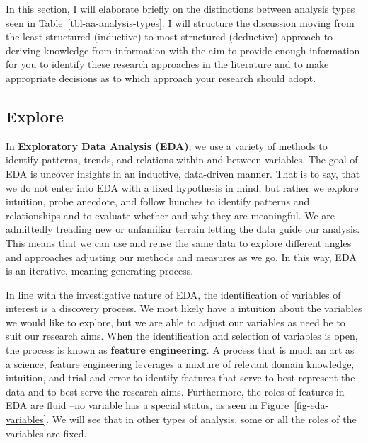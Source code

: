 \documentclass[
  letterpaper,
]{latex/krantz}
\theoremstyle{definition}
\theoremstyle{remark}
\begin{document}
In this section, I will elaborate briefly on the distinctions between
analysis types seen in Table~\ref{tbl-aa-analysis-types}. I will
structure the discussion moving from the least structured (inductive) to
most structured (deductive) approach to deriving knowledge from
information with the aim to provide enough information for you to
identify these research approaches in the literature and to make
appropriate decisions as to which approach your research should adopt.

\subsection{Explore}\label{sec-aa-explore}

In \textbf{Exploratory Data Analysis (EDA)}, we use a variety of methods
to identify patterns, trends, and relations within and between
variables. The goal of EDA is uncover insights in an inductive,
data-driven manner. That is to say, that we do not enter into EDA with a
fixed hypothesis in mind, but rather we explore intuition, probe
anecdote, and follow hunches to identify patterns and relationships and
to evaluate whether and why they are meaningful. We are admittedly
treading new or unfamiliar terrain letting the data guide our analysis.
This means that we can use and reuse the same data to explore different
angles and approaches adjusting our methods and measures as we go. In
this way, EDA is an iterative, meaning generating process.

In line with the investigative nature of EDA, the identification of
variables of interest is a discovery process. We most likely have a
intuition about the variables we would like to explore, but we are able
to adjust our variables as need be to suit our research aims. When the
identification and selection of variables is open, the process is known
as \textbf{feature engineering}. A process that is much an art as a
science, feature engineering leverages a mixture of relevant domain
knowledge, intuition, and trial and error to identify features that
serve to best represent the data and to best serve the research aims.
Furthermore, the roles of features in EDA are fluid --no variable has a
special status, as seen in Figure~\ref{fig-eda-variables}. We will see
that in other types of analysis, some or all the roles of the variables
are fixed.
\end{document}
